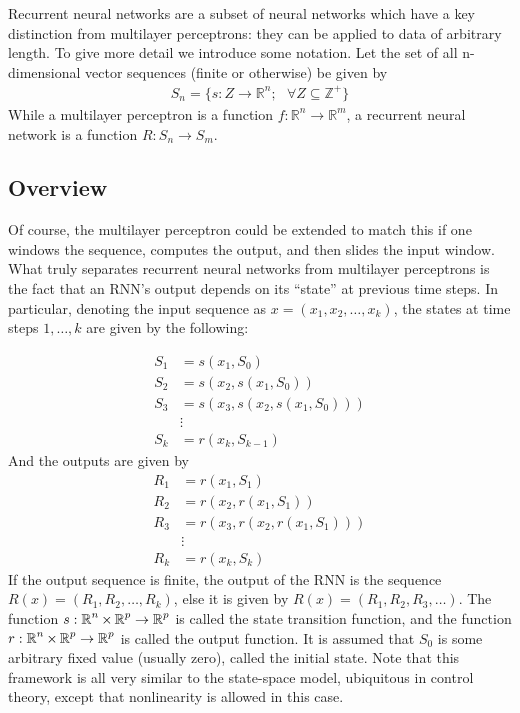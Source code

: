 Recurrent neural networks are a subset of neural networks which have a key distinction from multilayer perceptrons: they can be applied to data of arbitrary length.  To give more detail we introduce some notation.  Let the set of all n-dimensional vector sequences (finite or otherwise) be given by
\begin{align}
S_n = \{s:Z \rightarrow \mathbb{R}^n; \text{ } \forall Z\subseteq\mathbb{Z}^+\}
\end{align}
While a multilayer perceptron is a function $f:\mathbb{R}^n\rightarrow \mathbb{R}^m$, a recurrent neural network is a function $R: S_n \rightarrow S_m$.

\subsection{Overview}

Of course, the multilayer perceptron could be extended to match this if one windows the sequence, computes the output, and then slides the input window.  What truly separates recurrent neural networks from multilayer perceptrons is the fact that an RNN's output depends on its ``state'' at previous time steps.  In particular, denoting the input sequence as $x = (x_1,x_2,\dots,x_k)$, the states at time steps $1,\dots,k$ are given by the following:

\begin{align}\label{eq:rnn_st_start}
S_1 &= s(x_1,S_0)\\
S_2 &= s(x_2,s(x_1,S_0))\\
S_3 &= s(x_3,s(x_2,s(x_1,S_0)))\\ \nonumber
&\vdots\\
S_k &= r(x_k,S_{k-1})\label{eq:rnn_st_end}
\end{align}
And the outputs are given by
\begin{align}\label{eq:rnn_out_start}
R_1 &= r(x_1,S_1)\\
R_2 &= r(x_2,r(x_1,S_1))\\
R_3 &= r(x_3,r(x_2,r(x_1,S_1)))\\ \nonumber
&\vdots\\
R_k &= r(x_k,S_{k})\label{eq:rnn_out_end}
\end{align}
If the output sequence is finite, the output of the RNN is the sequence $R(x) = (R_1,R_2,\dots,R_k)$, else it is given by $R(x) = (R_1,R_2,R_3,\dots)$.  The function $s:\operatorname*{\mathbb{R}}^n \times \operatorname*{\mathbb{R}}^p \rightarrow \operatorname*{\mathbb{R}}^p$ is called the state transition function, and the function $r:\operatorname*{\mathbb{R}}^n \times \operatorname*{\mathbb{R}}^p \rightarrow \operatorname*{\mathbb{R}}^p$ is called the output function.  It is assumed that $S_0$ is some arbitrary fixed value (usually zero), called the initial state.  Note that this framework is all very similar to the state-space model, ubiquitous in control theory, except that nonlinearity is allowed in this case.


